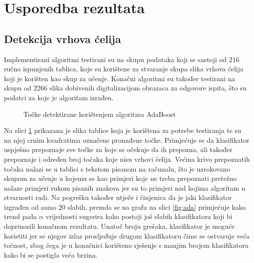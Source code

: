 \documentclass[times, utf8, zavrsni, numeric]{fer}
\begin{document}
\section{Usporedba rezultata}

\subsection{Detekcija vrhova ćelija}
Implementirani algoritmi testirani su na skupu podataka koji se sastoji od $216$ ručno ispunjenih tablica, koje su korištene za stvaranje skupa slika vrhova ćelija koji je korišten kao skup za učenje.
Konačni algoritmi su također testirani na skupu od $2266$ slika dobivenih digitalizacijom obrazaca za odgovore ispita, što su podatci za koje je algoritam izrađen.

\begin{figure}[!ht]
    \centering
    \captionsetup{justification=centering}
    \caption{Točke detektirane korištenjem algoritma AdaBoost}
    \label{fig:adaResult}
\end{figure}

Na slici \ref{fig:adaResult} prikazana je slika tablice koja je korištena za potrebe testiranja te su na njoj crnim kvadratima označene pronađene točke.
Primjećuje se da klasifikator uspješno prepoznaje sve točke za koje se očekuje da ih prepozna, ali također prepoznaje i određen broj točaka koje nisu vrhovi ćelija.
Većina krivo prepoznatih točaka nalazi se u tablici s tekstom pisanom na računalu, što je uzrokovano skupom za učenje u kojemu se kao primjeri koje ne treba prepoznati pretežno nalaze primjeri rukom pisanih znakova jer su to primjeri nad kojima algoritam u stvarnosti radi.
Na pogrešku također utječe i činjenica da je jaki klasifikator izgrađen od samo $20$ slabih, premda se na grafu na slici \ref{fig:ada} primjećuje kako trend pada $\alpha$ vrijednosti sugerira kako postoji još slabih klasifikatora koji bi doprinosili konačnom rezultatu.
Unatoč broju grešaka, klasifikator je moguće koristiti jer se njegov izlaz prosljeđuje drugom klasifikatoru čime se ostvaruje veća točnost, zbog čega je u konačnici korišteno rješenje s manjim brojem klasifikatora kako bi se postigla veća brzina.\\
\end{document}
